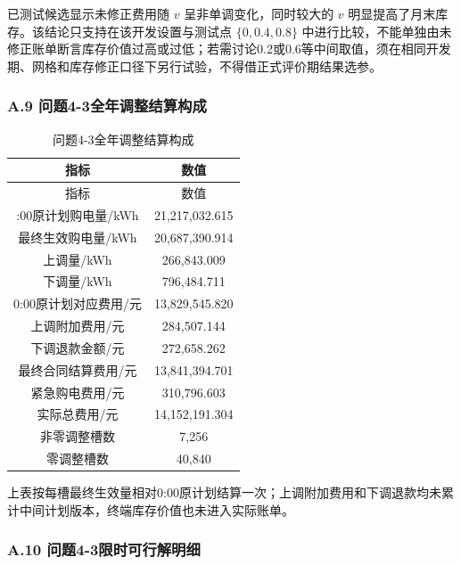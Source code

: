 \documentclass[zihao=-4,a4paper,UTF8,fontset=none]{ctexart}
\begin{document}
\endgroup

已测试候选显示未修正费用随 \(v\) 呈非单调变化，同时较大的 \(v\) 明显提高了月末库存。该结论只支持在该开发设置与测试点 \(\{0,0.4,0.8\}\) 中进行比较，不能单独由未修正账单断言库存价值过高或过低；若需讨论0.2或0.6等中间取值，须在相同开发期、网格和库存修正口径下另行试验，不得借正式评价期结果选参。

\par\pagebreak[2]\subsubsection*{A.9 问题4-3全年调整结算构成}

\begingroup\renewcommand{\tablename}{附表}\renewcommand{\thetable}{A-9}

\begin{longtable}[]{@{}cc@{}}
\caption{问题4-3全年调整结算构成}\label{tab:appendix-A-9}\tabularnewline
\toprule\noalign{}
指标 & 数值 \\
\midrule\noalign{}
\endfirsthead
\toprule\noalign{}
指标 & 数值 \\
\midrule\noalign{}
\endhead
\bottomrule\noalign{}
\endlastfoot
0:00原计划购电量/kWh & 21,217,032.615 \\
最终生效购电量/kWh & 20,687,390.914 \\
上调量/kWh & 266,843.009 \\
下调量/kWh & 796,484.711 \\
0:00原计划对应费用/元 & 13,829,545.820 \\
上调附加费用/元 & 284,507.144 \\
下调退款金额/元 & 272,658.262 \\
最终合同结算费用/元 & 13,841,394.701 \\
紧急购电费用/元 & 310,796.603 \\
实际总费用/元 & 14,152,191.304 \\
非零调整槽数 & 7,256 \\
零调整槽数 & 40,840 \\
\end{longtable}

\endgroup

上表按每槽最终生效量相对0:00原计划结算一次；上调附加费用和下调退款均未累计中间计划版本，终端库存价值也未进入实际账单。

\par\pagebreak[2]\subsubsection*{A.10 问题4-3限时可行解明细}
\end{document}
